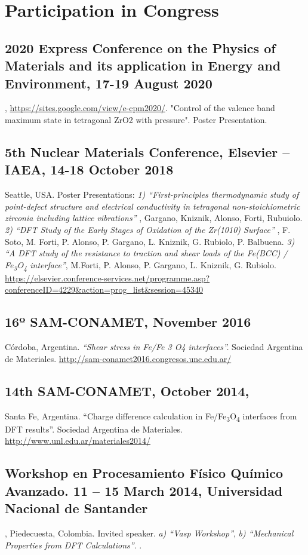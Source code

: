 \section{Participation in Congress}

\subsection{
  2020 Express Conference on the Physics of Materials and its application in Energy and Environment,
  17-19 August 2020
}, \href{on-lineevent}{  https://sites.google.com/view/e-cpm2020/}.
"Control of the valence band maximum   state in tetragonal ZrO2 with pressure". Poster Presentation.

\subsection{ 5th Nuclear Materials Conference, Elsevier – IAEA, 14-18 October 2018} Seattle, USA. Poster Presentations:
\emph{ 1) “First-principles thermodynamic study of point-defect structure and electrical conductivity in tetragonal non-stoichiometric zirconia including lattice vibrations”} , Gargano, Kniznik, Alonso, Forti, Rubuiolo. \emph{ 2) “DFT Study of the Early Stages of Oxidation of the Zr(1010) Surface”} , F. Soto, M. Forti, P. Alonso, P. Gargano, L. Kniznik, G. Rubiolo, P. Balbuena. \emph{ 3) “A DFT study of the resistance to traction and shear loads of the Fe(BCC) / Fe\textsubscript{3}O\textsubscript{4} interface”}, M.Forti, P. Alonso, P. Gargano, L. Kniznik, G. Rubiolo. 
\url{https://elsevier.conference-services.net/programme.asp?conferenceID=4229&action=prog_list&session=45340}

\subsection{16º SAM-CONAMET, November 2016} Córdoba, Argentina. \emph{“Shear stress in Fe/Fe 3 O4 interfaces”. }Sociedad Argentina de Materiales. \url{http://sam-conamet2016.congresos.unc.edu.ar/}

\subsection{14th SAM-CONAMET, October 2014,} Santa Fe, Argentina. “Charge difference calculation in Fe/Fe\textsubscript{3}O\textsubscript{4} interfaces from DFT results”. Sociedad Argentina de Materiales. \url{http://www.unl.edu.ar/materiales2014/}

\subsection{ Workshop en Procesamiento Físico Químico Avanzado. 11 – 15 March 2014, Universidad Nacional de Santander}, Piedecuesta, Colombia. Invited speaker. \emph{ a) “Vasp Workshop”},\emph{ b) “Mechanical Properties from DFT Calculations”}. 
.

